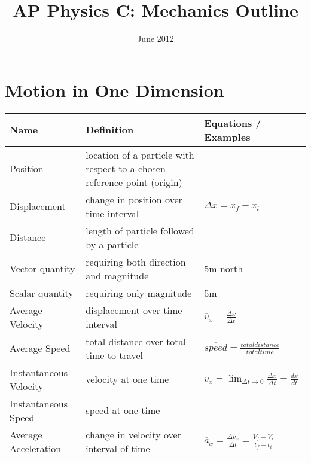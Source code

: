 \documentclass[11pt]{article}
\title{AP Physics C: Mechanics Outline}
\date{June 2012}
\begin{document}
\maketitle
\pagebreak

\section{Motion in One Dimension}
\begin{tabularx}{\textwidth}{l| X l}
    Name                       & Definition                                                               & Equations / Examples \\ \hline
    Position                   & location of a particle with respect to a chosen reference point (origin) & \\ \hline
    Displacement               & change in position over time interval                                    & $ \Delta x=x_{f} - x_{i} $ \bigstrut \\ \hline
    Distance                   & length of particle followed by a particle                                & \\ \hline
    Vector quantity            & requiring both direction and magnitude                                   & 5m north \\ \hline
    Scalar quantity            & requiring only magnitude                                                 & 5m \\ \hline
    Average Velocity           & displacement over time interval                                          & $ \overline{v}_{x} = \frac{ \Delta x}{ \Delta t } $ \bigstrut \\ \hline
    Average Speed              & total distance over total time to travel                                 & $ \overline{speed} = \frac{ total distance }{ total time } $ \bigstrut \\ \hline
    Instantaneous Velocity     & velocity at one time                                                     & $ v_{x} = \lim_{ \Delta t \to 0} \frac{\Delta x}{\Delta t} = \frac{dx}{dt} $ \bigstrut \\ \hline
    Instantaneous Speed        & speed at one time                                                        & \\ \hline
    Average Acceleration       & change in velocity over interval of time                                 & $ \overline{a}_{x} = \frac{\Delta v_{x}}{\Delta t} = \frac{V_{f}-V_{i}}{t_{f}-t_{i}} $ \bigstrut \\ \hline

\end{tabularx}
\end{document}
